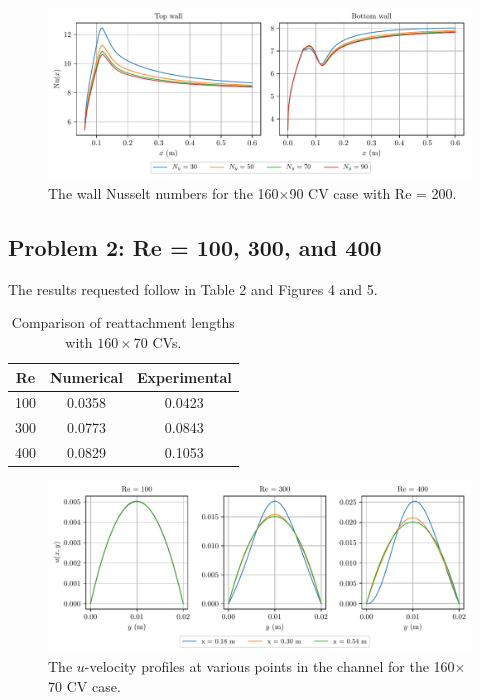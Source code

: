 \documentclass{article}
\begin{document}
\begin{figure}[H]
	\centering
	\includegraphics[width=0.9\linewidth]{../results/1c_Nu}
	\caption{The wall Nusselt numbers for the 160$\times$90 CV case with Re = 200.}
	\label{fig:1c_Nu}
\end{figure}

\subsection{Problem 2: Re = 100, 300, and 400}

The results requested follow in Table 2 and Figures 4 and 5.

\def\arraystretch{1.3}
\begin{table}[H]
	\small
	\centering
	\caption{Comparison of reattachment lengths with $160 \times 70$ CVs.}
	\vspace{0.2cm}
	\begin{tabular}{c|c|c}
		Re & Numerical & Experimental \\
		\hline
		100 & 0.0358 & 0.0423 \\
		300 & 0.0773 & 0.0843 \\
		400 & 0.0829 & 0.1053 \\
	\end{tabular}
	\label{table:b-temps}
\end{table}

\begin{figure}[H]
	\centering
	\includegraphics[width=0.9\linewidth]{../results/2_u}
	\caption{The $u$-velocity profiles at various points in the channel for the 160$\times$70 CV case.}
	\label{fig:2_u}
\end{figure}
\end{document}
